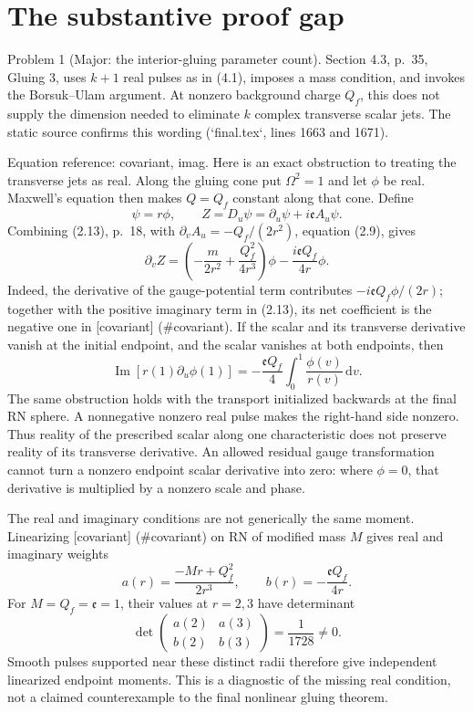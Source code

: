 \documentclass[10pt]{article}
\begin{document}
\section*{The substantive proof gap}
Problem 1 (Major: the interior-gluing parameter count).  Section 4.3, p. 35, Gluing 3, uses \(k+1\) real pulses as in (4.1), imposes a mass condition, and invokes the Borsuk–Ulam argument. At nonzero background charge \(Q_f\), this does not supply the dimension needed to eliminate \(k\) complex transverse scalar jets. The static source confirms this wording (`final.tex`, lines 1663 and 1671).\par
Equation reference: covariant, imag. Here is an exact obstruction to treating the transverse jets as real. Along the gluing cone put \(\Omega^2=1\) and let \(\phi\) be real. Maxwell’s equation then makes \(Q=Q_f\) constant along that cone. Define \[\psi=r\phi,\qquad Z=D_u\psi=\partial_u\psi+i\mathfrak eA_u\psi .\] Combining (2.13), p. 18, with \(\partial_v A_u=-Q_f/(2r^2)\), equation (2.9), gives \[
 \partial_v Z=
 \left(-\frac{m}{2r^2}+\frac{Q_f^2}{4r^3}\right)\phi
       -\frac{i\mathfrak eQ_f}{4r}\phi .\] Indeed, the derivative of the gauge-potential term contributes \(-i\mathfrak eQ_f\phi/(2r)\); together with the positive imaginary term in (2.13), its net coefficient is the negative one in [covariant] (\#covariant). If the scalar and its transverse derivative vanish at the initial endpoint, and the scalar vanishes at both endpoints, then \[
 \operatorname{Im}\!\left[r(1)\partial_u\phi(1)\right]
   =-\frac{\mathfrak eQ_f}{4}
       \int_0^1\frac{\phi(v)}{r(v)}\,\mathrm dv .\] The same obstruction holds with the transport initialized backwards at the final RN sphere. A nonnegative nonzero real pulse makes the right-hand side nonzero. Thus reality of the prescribed scalar along one characteristic does not preserve reality of its transverse derivative. An allowed residual gauge transformation cannot turn a nonzero endpoint scalar derivative into zero: where \(\phi=0\), that derivative is multiplied by a nonzero scale and phase.\par
The real and imaginary conditions are not generically the same moment. Linearizing [covariant] (\#covariant) on RN of modified mass \(M\) gives real and imaginary weights \[a(r)=\frac{-Mr+Q_f^2}{2r^3},\qquad
 b(r)=-\frac{\mathfrak eQ_f}{4r}.\] For \(M=Q_f=\mathfrak e=1\), their values at \(r=2,3\) have determinant \[\det\begin{pmatrix}a(2)&a(3)\\b(2)&b(3)\end{pmatrix}
 =\frac{1}{1728}\ne0.\] Smooth pulses supported near these distinct radii therefore give independent linearized endpoint moments. This is a diagnostic of the missing real condition, not a claimed counterexample to the final nonlinear gluing theorem.\par
\end{document}

